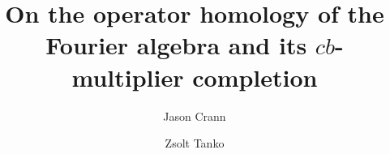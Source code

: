 \documentclass[preprint,12pt]{elsarticle}
\begin{document}
\begin{frontmatter}




\title{On the operator homology of the Fourier algebra and its $cb$-multiplier completion}
\author[JC1]{Jason Crann}
\author[ZT]{Zsolt Tanko}

\address[JC1]{School of Mathematics and Statistics, Carleton University, Ottawa, ON, Canada H1S 5B6}
\address[ZT]{Department of Pure Mathematics, University of Waterloo, Waterloo, ON, Canada N2L 3G1}



\end{frontmatter}
\end{document}
